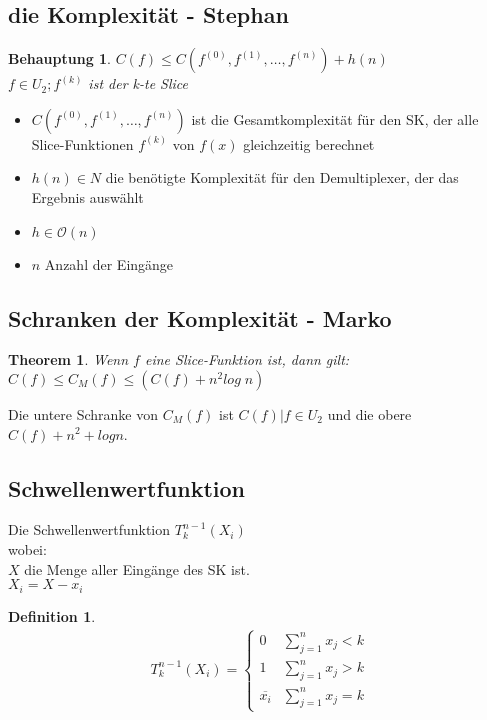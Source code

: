 \documentclass[a4paper,10pt]{article}
\newtheorem{thm}{Theorem}
\newtheorem{defin}{Definition}
\newtheorem{beh}{Behauptung}
\begin{document}
  \subsection{die Komplexität - Stephan}
    \begin{beh}
      $C(f) \leq C(f^{(0)}, f^{(1)}, \dots ,f^{(n)})+h(n)$\\
      $f \in U_2; f^{(k)}$ ist der k-te Slice
    \end{beh}
    \begin{itemize}
      \item $C(f^{(0)}, f^{(1)}, \dots ,f^{(n)})$ ist die Gesamtkomplexität für den SK, der alle Slice-Funktionen $f^{(k)}$ von $f(x)$ gleichzeitig berechnet
      \item $h(n) \in N$ die benötigte Komplexität für den Demultiplexer, der das Ergebnis ausw\"ahlt
      \item $h \in \mathcal{O}(n)$
      \item $n$ Anzahl der Eingänge
    \end{itemize}


  \subsection{Schranken der Komplexität - Marko}
    \begin{thm}
      Wenn $f$ eine Slice-Funktion ist, dann gilt:
      $C(f) \leq C_M(f) \leq (C(f) +n^2 log\;n)$%
    \end{thm}
    Die untere Schranke von $C_M(f)$ ist $C(f)|f \in U_2$ und die obere $C(f) + n^2 + log n$.

  \subsection*{Schwellenwertfunktion}
     Die Schwellenwertfunktion $ T^{n-1}_k(X_i)$\\
     wobei: \\
     $X$ die Menge aller Eingänge des SK ist.\\
     $X_i = X- x_i$
     \begin{defin}
       \begin{align*}
       T^{n-1}_k (X_i)=
       \begin{cases}
         0 & \sum\nolimits_{j=1}^{n} x_j < k\\
         1 & \sum\nolimits_{j=1}^{n} x_j > k\\
         \overline{x_i} & \sum\nolimits_{j=1}^{n} x_j = k
        \end{cases}
       \end{align*}
      \end{defin}
\end{document}
